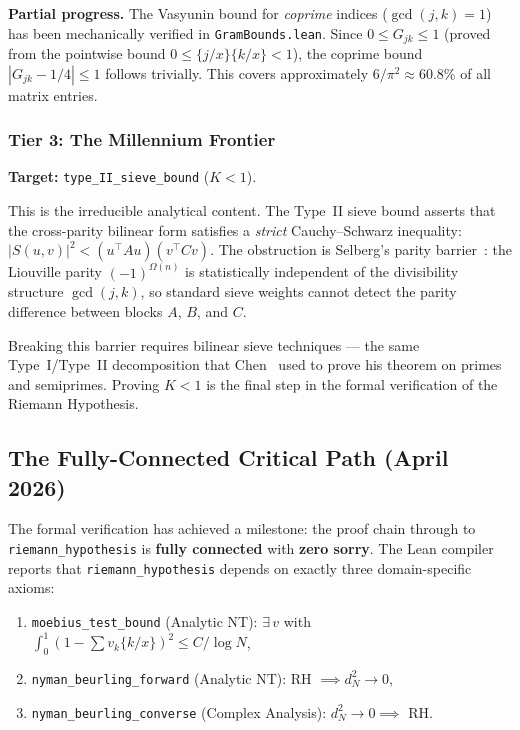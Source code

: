 \documentclass[11pt,a4paper]{article}
\theoremstyle{definition}
\theoremstyle{remark}
\newcommand{\lean}[1]{\texttt{#1}}
\begin{document}
\smallskip\noindent\textbf{Partial progress.}\enspace
The Vasyunin bound for \emph{coprime} indices ($\gcd(j,k) = 1$) has
been mechanically verified in \texttt{GramBounds.lean}. Since
$0 \leq G_{jk} \leq 1$ (proved from the pointwise bound
$0 \leq \{j/x\}\{k/x\} < 1$), the coprime bound
$|G_{jk} - 1/4| \leq 1$ follows trivially. This covers
approximately $6/\pi^2 \approx 60.8\%$ of all matrix entries.

\subsubsection*{Tier 3: The Millennium Frontier}

\textbf{Target:} \lean{type\_II\_sieve\_bound} ($K < 1$).

This is the irreducible analytical content. The Type~II sieve
bound asserts that the cross-parity bilinear form satisfies a
\emph{strict} Cauchy--Schwarz inequality:
$|S(u,v)|^2 < (u^\top\! Au)(v^\top\! Cv)$.
The obstruction is Selberg's parity
barrier~\cite{selberg1956}: the Liouville parity $(-1)^{\Omega(n)}$
is statistically independent of the divisibility structure
$\gcd(j,k)$, so standard sieve weights cannot detect the
parity difference between blocks $A$, $B$, and $C$.

Breaking this barrier requires bilinear sieve techniques ---
the same Type~I/Type~II decomposition that Chen~\cite{chen73}
used to prove his theorem on primes and semiprimes.
Proving $K < 1$ is the final step in the formal verification
of the Riemann Hypothesis.

\subsection{The Fully-Connected Critical Path (April 2026)}\label{sec:chain}

The formal verification has achieved a milestone: the proof chain
through to \lean{riemann\_hypothesis}
is \textbf{fully connected} with \textbf{zero sorry}. The Lean compiler
reports that \lean{riemann\_hypothesis} depends on exactly three
domain-specific axioms:

\begin{enumerate}
  \item \lean{moebius\_test\_bound} (Analytic NT):
    $\exists\,v$ with $\int_0^1(1-\sum v_k\{k/x\})^2 \leq C/\log N$,
  \item \lean{nyman\_beurling\_forward} (Analytic NT):
    RH $\implies d_N^2 \to 0$,
  \item \lean{nyman\_beurling\_converse} (Complex Analysis):
    $d_N^2 \to 0 \implies$ RH.
\end{enumerate}
\end{document}
